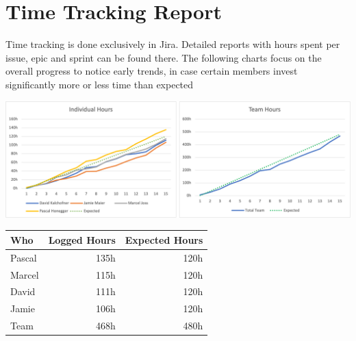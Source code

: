 \chapter{Time Tracking Report}

Time tracking is done exclusively in Jira.
Detailed reports with hours spent per issue, epic and sprint can be found there.
The following charts focus on the overall progress to notice early trends, in case certain members invest significantly more or less time than expected

\noindent\includegraphics[width=\textwidth]{resources/time-tracking-report}

\begin{table}[H]
    \begin{tabular}{l|r|r}
        \textbf{Who} & \textbf{Logged Hours} & \textbf{Expected Hours} \\
        \hline
        Pascal & 135h & 120h \\
        Marcel & 115h & 120h \\
        David  & 111h & 120h \\
        Jamie  & 106h & 120h \\
        \hline
        Team   & 468h & 480h
    \end{tabular}
\end{table}

